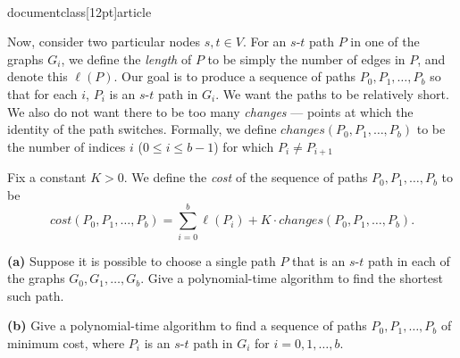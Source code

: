 \\documentclass[12pt]{article}
\begin{document}
\begin{enumerate}
Now, consider two particular nodes $s, t \in V$. 
For an $s$-$t$ path $P$ in one of the graphs $G_i$, 
we define the {\em length} of $P$ to be simply the number 
of edges in $P$, and denote this $\ell(P)$. 
Our goal is to produce a sequence of paths  
$P_0, P_1, \ldots, P_b$ so that 
for each $i$, $P_i$ is an $s$-$t$ path in $G_i$. 
We want the paths to be relatively short. 
We also do not want there to be too many {\em changes} --- 
points at which the identity of the path switches. 
Formally, we define  
$changes(P_0, P_1, \ldots, P_b)$ to be the number of 
indices $i$ ($0 \leq i \leq b-1$) for which $P_i \neq P_{i+1}$ 
 
Fix a constant $K > 0$. 
We define the {\em cost} of the sequence of paths 
$P_0, P_1, \ldots, P_b$ to be 
$$cost(P_0, P_1, \ldots, P_b) =  
\sum_{i=0}^b \ell(P_i) + K \cdot changes(P_0, P_1, \ldots, P_b).$$ 

{\bf (a)} Suppose it is possible to choose a single path $P$
that is an $s$-$t$ path in each of the graphs $G_0, G_1, \ldots, G_b$.
Give a polynomial-time algorithm to find the shortest such path.

{\bf (b)} Give a polynomial-time algorithm to find a sequence of 
paths $P_0, P_1, \ldots, P_b$
of minimum cost, where $P_i$ is an $s$-$t$ path in $G_i$ 
for $i = 0, 1, \ldots, b$. 
 
 
\end{enumerate}
\end{document}
